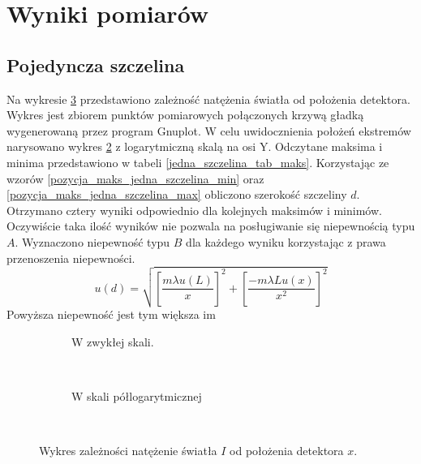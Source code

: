 \documentclass{article}
\begin{document}
\newpage
\section{Wyniki pomiarów}
\subsection{Pojedyncza szczelina}
Na wykresie \ref{jedna_szczelina_calosc} przedstawiono zależność natężenia światła od położenia detektora. Wykres jest zbiorem punktów pomiarowych połączonych krzywą gładką wygenerowaną przez program Gnuplot. W celu uwidocznienia położeń ekstremów narysowano wykres \ref{jedna_szczelina_log} z logarytmiczną skalą na osi Y. Odczytane maksima i minima przedstawiono w tabeli \ref{jedna_szczelina_tab_maks}. Korzystając ze wzorów \ref{pozycja_maks_jedna_szczelina_min} oraz \ref{pozycja_maks_jedna_szczelina_max} obliczono szerokość szczeliny $d$. Otrzymano cztery wyniki odpowiednio dla kolejnych maksimów i minimów. Oczywiście taka ilość wyników nie pozwala na posługiwanie się niepewnością typu $A$. Wyznaczono niepewność typu $B$ dla każdego wyniku korzystając z prawa przenoszenia niepewności.
\begin{equation*}
	u(d) = \sqrt{\left[\frac{m\lambda u(L)}{x} \right]^2 + \left[\frac{-m\lambda L u(x)}{x^2} \right]^2}
\end{equation*}
Powyższa niepewność jest tym większa im 
\begin{figure}[h!]
        \centering
        \begin{subfigure}[b]{\textwidth}
			\fontsize{6}{8}\selectfont %
			\centering
			\resizebox{0.9\textwidth}{!}{}		
			\caption{W zwykłej skali.}
			\label{jedna_szczelina}
        \end{subfigure}%
        ~ %
          
        \begin{subfigure}[b]{\textwidth}
			\fontsize{6}{8}\selectfont %
			\centering
			\resizebox{0.9\textwidth}{!}{}	
			\caption{W skali półlogarytmicznej}
			\label{jedna_szczelina_log}
        \end{subfigure}
        ~ %
        \caption{Wykres zależności natężenie światła $I$ od położenia detektora $x$.}\label{jedna_szczelina_calosc}
\end{figure}
\end{document}
